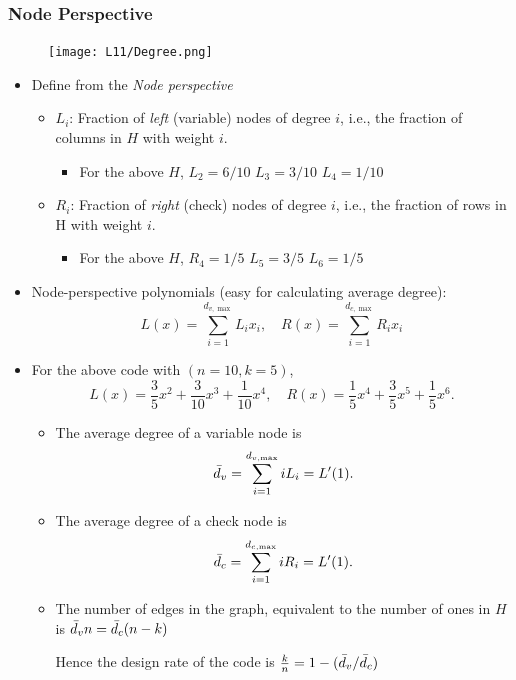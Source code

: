 \documentclass[12pt]{article}
\begin{document}
\subsubsection{Node Perspective}
\begin{figure}[H]
    \centering
    \texttt{[image: L11/Degree.png]}
\end{figure}
\begin{itemize}
    \item Define from the \textit{Node perspective}
    \begin{itemize}
    \item $L_i$: Fraction of \textit{left} (variable) nodes of degree $i$, i.e., the fraction of columns in $H$ with weight $i$.
    \begin{itemize}
        \item For the above $H$, $L_2 = 6/10$ $L_3 = 3/10$ $L_4=1/10$
    \end{itemize}
    \item $R_i$: Fraction of \textit{right} (check) nodes of degree $i$, i.e., the fraction of rows in H with weight $i$.
    \begin{itemize}
        \item For the above $H$, $R_4 = 1/5$ $L_5 = 3/5$ $L_6=1/5$
    \end{itemize}
    \end{itemize}
    \item Node-perspective polynomials (easy for calculating average degree):
    \[
    L(x) = \sum_{i=1}^{d_{v,\max}}L_i x_i, \quad R(x) = \sum_{i=1}^{d_{c,\max}}R_i x_i
    \]
    \item For the above code with $(n=10,k=5)$,
    \[
    L(x) = \frac{3}{5}x^2 +\frac{3}{10}x^3+\frac{1}{10}x^4,\quad R(x)=\frac{1}{5}x^4 + \frac{3}{5}x^5 + \frac{1}{5}x^6.
    \]
\begin{itemize}
    \item The average degree of a variable node is 
    \[
    \Bar{d}_v = \sum_{i=1}^{d_{v,\max}} i L_i = L'(1).
    \]
    \item The average degree of a check node is 
    \[
    \Bar{d}_c = \sum_{i=1}^{d_{c,\max}} i R_i = L'(1).
    \]
    \item The number of edges in the graph, equivalent to the number of ones in $H$ is $\Bar{d}_v n =  \Bar{d}_c (n-k)$
    \begin{center}
        \large Hence the design rate of the code is $\frac{k}{n} = 1 - (\Bar{d}_v / \Bar{d}_c)$
    \end{center}
\end{itemize}
\end{itemize}
\end{document}
